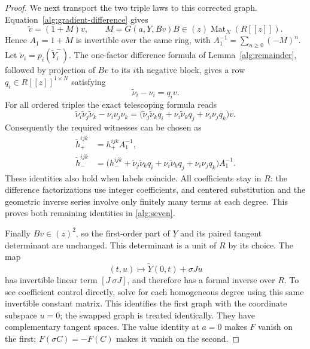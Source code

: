 \begin{proof}
We next transport the two triple laws to this corrected graph.
Equation~\eqref{alg:gradient-difference} gives
\begin{equation}
 \widetilde v=(1+M)v,\qquad
 M=G(a,Y,Bv)B\in(z)\operatorname{Mat}_N(R[[z]]).
 \label{alg:gradient-transport}
\end{equation}
Hence $A_1=1+M$ is invertible over the same ring, with
$A_1^{-1}=\sum_{n\geq0}(-M)^n$. Let
$\widetilde\nu_i=p_i(\widetilde Y_i^-)$.
The one-factor difference formula of Lemma~\ref{alg:remainder}, followed
by projection of $Bv$ to its $i$th negative block, gives a row
$q_i\in R[[z]]^{1\times N}$ satisfying
\begin{equation}
 \widetilde\nu_i-\nu_i=q_i v.
 \label{alg:negative-factor-transport}
\end{equation}
For all ordered triples the exact telescoping formula reads
\[
 \widetilde\nu_i\widetilde\nu_j\widetilde\nu_k-\nu_i\nu_j\nu_k
 =\bigl(\widetilde\nu_j\widetilde\nu_kq_i
       +\nu_i\widetilde\nu_kq_j+\nu_i\nu_jq_k\bigr)v.
\]
Consequently the required witnesses can be chosen as
\begin{equation}
 \begin{split}
 \widetilde h_+^{ijk}&=h_+^{ijk}A_1^{-1},\\
 \widetilde h_-^{ijk}&=
 \bigl(h_-^{ijk}+\widetilde\nu_j\widetilde\nu_kq_i
       +\nu_i\widetilde\nu_kq_j+\nu_i\nu_jq_k\bigr)A_1^{-1}.
 \end{split}
 \label{alg:witness-transport}
\end{equation}
These identities also hold when labels coincide. All coefficients stay
in $R$: the difference factorizations use integer coefficients, and
centered substitution and the geometric inverse series involve only
finitely many terms at each degree. This proves both remaining
identities in \eqref{alg:seven}.

Finally $Bv\in(z)^2$, so the first-order part of $Y$ and its paired
tangent determinant are unchanged. This determinant is a unit of $R$
by its choice. The map
\[
 (t,u)\longmapsto\widetilde Y(0,t)+\sigma J u
\]
has invertible linear term $[J\ \sigma J]$, and therefore has a formal
inverse over $R$. To see coefficient control directly, solve for each
homogeneous degree using this same invertible constant matrix. This
identifies the first graph with the coordinate subspace $u=0$; the
swapped graph is treated identically. They have complementary tangent
spaces. The value identity at $a=0$ makes $F$ vanish on the first;
$F(\sigma C)=-F(C)$ makes it vanish on the second.
\end{proof}

